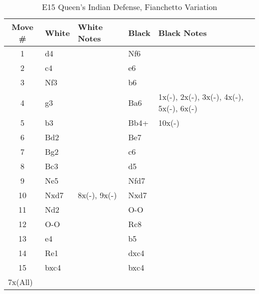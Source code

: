 \begin{table}[htbp]
\centering
\scriptsize
\caption{E15 Queen's Indian Defense, Fianchetto Variation}
\begin{tabular}{|c|l|p{5cm}|l|p{5cm}|}
\hline
\textbf{Move \#} & \textbf{White} & \textbf{White Notes} & \textbf{Black} & \textbf{Black Notes} \\
\hline
1  & d4    &         & Nf6   &         \\
2  & c4    &         & e6    &         \\
3  & Nf3   &         & b6    &         \\
4  & g3    &         & Ba6   & 1x(-), 2x(-), 3x(-), 4x(-), 5x(-), 6x(-) \\
5  & b3    &         & Bb4+  & 10x(-)  \\
6  & Bd2   &         & Be7   &         \\
7  & Bg2   &         & c6    &         \\
8  & Bc3   &         & d5    &         \\
9  & Ne5   &         & Nfd7  &         \\
10 & Nxd7  & 8x(-), 9x(-) & Nxd7  &         \\
11 & Nd2   &         & O-O   &         \\
12 & O-O   &         & Rc8   &         \\
13 & e4    &         & b5    &         \\
14 & Re1   &         & dxc4  &         \\
15 & bxc4  &         & bxc4  &         \\
\hline
\multicolumn{5}{|l|}{7x(All)} \\
\hline
\end{tabular}
\end{table}


